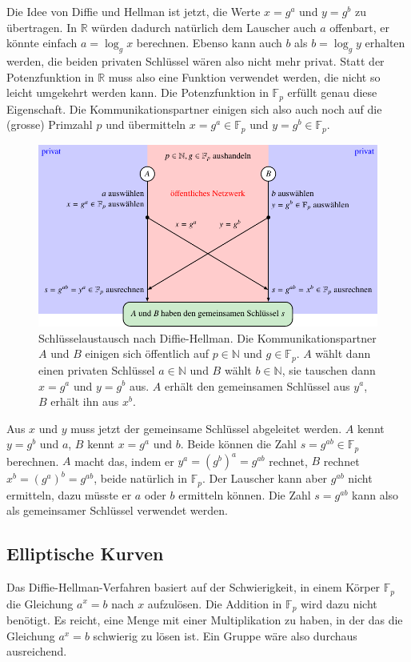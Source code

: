 Die Idee von Diffie und Hellman ist jetzt, die Werte $x=g^a$ und $y=g^b$
zu übertragen.
In $\mathbb{R}$ würden dadurch natürlich dem Lauscher auch $a$ offenbart,
er könnte einfach $a=\log_g x$ berechnen.
Ebenso kann auch $b$ als $b=\log_g y$ erhalten werden, die beiden
privaten Schlüssel wären also nicht mehr privat.
Statt der Potenzfunktion in $\mathbb{R}$ muss also eine Funktion
verwendet werden, die nicht so leicht umgekehrt werden kann.
Die Potenzfunktion in $\mathbb{F}_p$ erfüllt genau diese Eigenschaft.
Die Kommunikationspartner einigen sich also auch noch auf die (grosse)
Primzahl $p$ und übermitteln $x=g^a\in\mathbb{F}_p$ und
$y=g^b\in\mathbb{F}_p$.

\begin{figure}
\centering
\includegraphics{chapters/90-crypto/images/dh.pdf}
\caption{Schlüsselaustausch nach Diffie-Hellman.
Die Kommunikationspartner $A$ und $B$ einigen sich öffentlich auf
$p\in\mathbb{N}$ und $g\in\mathbb{F}_p$.
$A$ wählt dann einen privaten Schlüssel $a\in\mathbb{N}$ und
$B$ wählt $b\in\mathbb{N}$, sie tauschen dann $x=g^a$ und $y=g^b$
aus.
$A$ erhält den gemeinsamen Schlüssel aus $y^a$, $B$ erhält ihn
aus $x^b$.
\label{buch:crypto:fig:dh}}
\end{figure}

Aus $x$ und $y$ muss jetzt der gemeinsame Schlüssel abgeleitet werden.
$A$ kennt $y=g^b$ und $a$, $B$ kennt $x=g^a$ und $b$.
Beide können die Zahl $s=g^{ab}\in\mathbb{F}_p$ berechnen.
$A$ macht das, indem er $y^a=(g^b)^a = g^{ab}$ rechnet,
$B$ rechnet $x^b = (g^a)^b = g^{ab}$, beide natürlich in $\mathbb{F}_p$.
Der Lauscher kann aber $g^{ab}$ nicht ermitteln, dazu müsste er
$a$ oder $b$ ermitteln können.
Die Zahl $s=g^{ab}$ kann also als gemeinsamer Schlüssel verwendet
werden.



\subsection{Elliptische Kurven
\label{buch:subsection:elliptische-kurven}}
Das Diffie-Hellman-Verfahren basiert auf der Schwierigkeit, in einem 
Körper $\mathbb{F}_p$ die Gleichung $a^x=b$ nach $x$ aufzulösen.
Die Addition in $\mathbb{F}_p$ wird dazu nicht benötigt.
Es reicht, eine Menge mit einer Multiplikation zu haben, in der das
die Gleichung $a^x=b$ schwierig zu lösen ist.
Ein Gruppe wäre also durchaus ausreichend.

